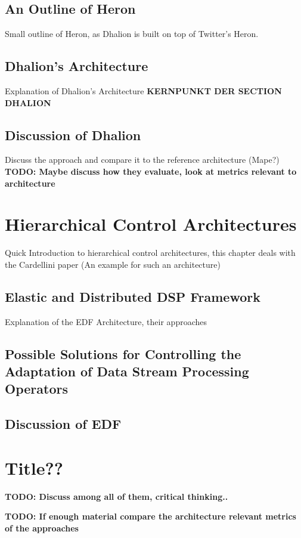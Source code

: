         \subsection{An Outline of Heron}
        \label{sub:heron-outline}
        Small outline of Heron, as Dhalion is built on top of Twitter's Heron.

        \subsection{Dhalion's Architecture}
        \label{sec:dhalion-architecture}
        Explanation of Dhalion's Architecture \textbf{KERNPUNKT DER SECTION DHALION}

        \subsection{Discussion of Dhalion}
        \label{sec:dhalion-discussion}
        Discuss the approach and compare it to the reference architecture (Mape?)
        \textbf{TODO: Maybe discuss how they evaluate, look at metrics relevant to architecture}

    \section{Hierarchical Control Architectures}
    \label{sec:hierarchical}
    Quick Introduction to hierarchical control architectures, this chapter deals with the Cardellini
    paper (An example for such an architecture)

        \subsection{Elastic and Distributed DSP Framework}
        \label{sec:edf}
        Explanation of the EDF Architecture, their approaches

        \subsection{Possible Solutions for Controlling the Adaptation of Data Stream Processing Operators}
        \label{sec:solutions-controlling}

        \subsection{Discussion of EDF}
        \label{sec:discussion-edf}

    \section{Title??}
    \textbf{TODO: Discuss among all of them, critical thinking..}

    \textbf{TODO: If enough material compare the architecture relevant metrics of the approaches}